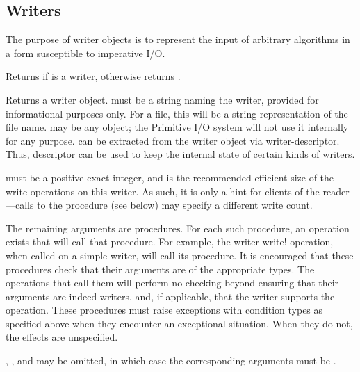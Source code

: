 \subsection{Writers}

The purpose of writer objects is to represent the input of arbitrary
algorithms in a form susceptible to imperative I/O.

\begin{entry}{%
}
   
Returns \schtrue{} if  is a writer, otherwise returns \schfalse.
\end{entry}

\begin{entry}{%
}
   
Returns a writer object.  must be a string naming the writer,
provided for informational purposes only. For a file, this will be a
string representation of the file name.  may be any
object; the Primitive I/O system will not use it internally for any
purpose.  can be extracted from the writer object via
{\cf writer-descriptor}. Thus, descriptor can be used to keep the
internal state of certain kinds of writers.

 must be a positive exact integer, and is the
recommended efficient size of the write operations on this writer. As
such, it is only a hint for clients of the reader---calls to the
 procedure (see below) may specify a different write
count.

The remaining arguments are procedures.  For each such procedure, an
operation exists that will call that procedure.  For example, the {\cf
  writer-write!} operation, when called on a simple writer, will call
its  procedure.
It is encouraged that these procedures check that their arguments are
of the appropriate types.  The operations that call them will perform
no checking beyond ensuring that their  arguments are
indeed writers, and, if applicable, that the writer supports the operation.
These procedures must raise
exceptions with condition types as specified above when they encounter an
exceptional situation. When they do not, the effects are unspecified.

, , and  may be
omitted, in which case the corresponding arguments must be \schfalse.


\end{entry}
